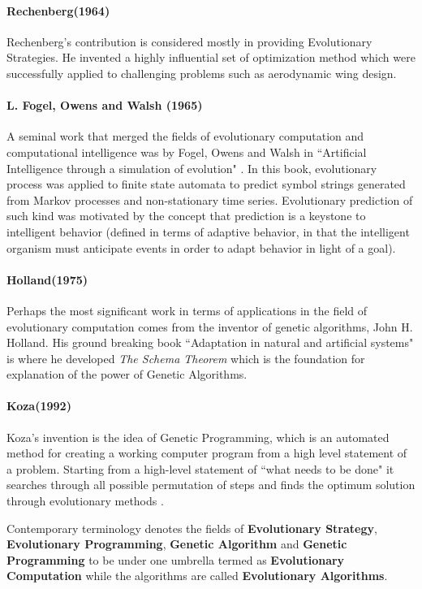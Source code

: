 \paragraph{Rechenberg(1964)}
Rechenberg's contribution is considered mostly in providing Evolutionary Strategies. He invented a highly influential set of optimization method which were successfully applied to challenging problems such as aerodynamic wing design. \cite{rechenberg1973}

\paragraph{L. Fogel, Owens and Walsh (1965)}
A seminal work that merged the fields of evolutionary computation and computational intelligence was by Fogel, Owens and Walsh in ``Artificial Intelligence through a simulation of evolution" \cite{fogel1966}. In this book, evolutionary process was applied to finite state automata to predict symbol strings generated from Markov processes and non-stationary time series. Evolutionary prediction of such kind was motivated by the concept that prediction is a keystone to intelligent behavior (defined in terms of adaptive behavior, in that the intelligent organism must anticipate events in order to adapt behavior in light of a goal). 

\paragraph{Holland(1975)}
Perhaps the most significant work in terms of applications in the field of evolutionary computation comes from the inventor of genetic algorithms, John H. Holland. His ground breaking book ``Adaptation in natural and artificial systems" \cite{holland1975} is where he developed \textit{The Schema Theorem} which is the foundation for explanation of the power of Genetic Algorithms.

\paragraph{Koza(1992)}
Koza's invention is the idea of Genetic Programming, which is an automated method for creating a working computer program from a high level statement of a problem. Starting from a high-level statement of ``what needs to be done" it searches through all possible permutation of steps and finds the optimum solution through evolutionary methods \cite{koza1992}.

Contemporary terminology denotes the fields of \textbf{Evolutionary Strategy}, \textbf{Evolutionary Programming}, \textbf{Genetic Algorithm} and \textbf{Genetic Programming} to be under one umbrella termed as \textbf{Evolutionary Computation} while the algorithms are called \textbf{Evolutionary Algorithms}.

